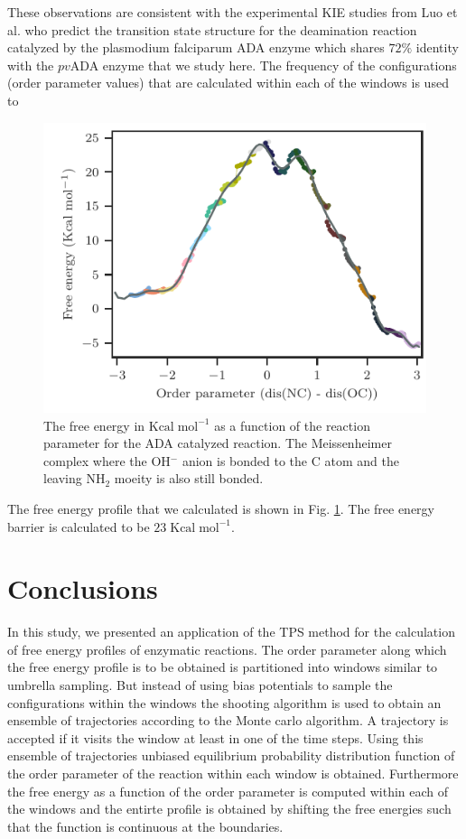 \documentclass[journal=jpcbfk,manuscript=article,layout=traditional]{achemso}
\begin{document}
These observations are consistent with the 
experimental KIE studies from Luo et al. \cite{Luo07JAmChemSoc129p8008}
who predict the transition state structure for the deamination reaction 
catalyzed by the plasmodium falciparum ADA enzyme which shares
$72\%$ identity with the $pv$ADA enzyme that we study here. The frequency of the 
configurations (order parameter values) that are calculated within each of the 
windows is used to  
\begin{figure}[h!]
\centering
\includegraphics[scale=1.0]{./figures/ada-fenergy.pdf}
\caption{The free energy in $\text{Kcal}\;\text{mol}^{-1}$ as a function of the reaction 
parameter for the ADA catalyzed reaction. The Meissenheimer complex where the OH$^{-}$ anion
is bonded to the C atom and the leaving NH$_2$ moeity is also still bonded.}
\label{fig:ada-fenergy}
\end{figure}
The free energy profile that we calculated is shown in Fig. \ref{fig:ada-fenergy}.
The free energy barrier is calculated to be $23\;\text{Kcal}\;\text{mol}^{-1}$.
\section{Conclusions}
In this study, we presented an application of the TPS method for the calculation 
of free energy profiles of enzymatic reactions. The order parameter along which the 
free energy profile is to be obtained is partitioned into windows similar to 
umbrella sampling. But instead of using bias potentials to sample the configurations
within the windows the shooting algorithm is used to
obtain an ensemble of trajectories according to the Monte carlo algorithm. A 
trajectory is accepted if it visits the window at least in one of the time steps. 
Using this ensemble of trajectories unbiased equilibrium probability distribution 
function of the order parameter of the reaction within each window is obtained.
Furthermore the free energy as a function of the order parameter is computed within 
each of the windows and the entirte profile is obtained by shifting the free energies
such that the function is continuous at the boundaries.   
\end{document}
